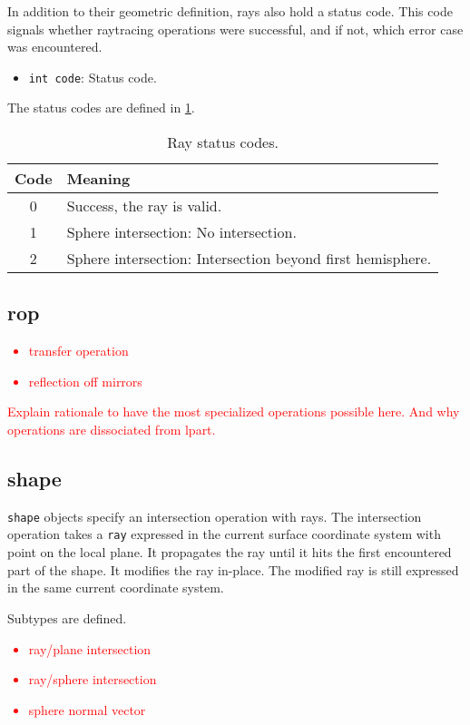 In addition to their geometric definition, rays also hold a status code.
This code signals whether raytracing operations were successful, and if
not, which error case was encountered.

\begin{itemize}
\item \lstinline{int code}: Status code.
\end{itemize}

The status codes are defined in \cref{tab:ray-status-codes}.

\begin{table} \caption{\label{tab:ray-status-codes} Ray status codes.}
\begin{tabular}{| c | l |} \hline
\textbf{Code} & \textbf{Meaning} \\ \hline
0 & Success, the ray is valid.\\ \hline
1 & Sphere intersection: No intersection. \\ \hline
2 & Sphere intersection: Intersection beyond first hemisphere. \\
\hline \end{tabular}
\end{table}

\subsection{rop}

\textcolor{red}{
\begin{itemize}
\item transfer operation
\item reflection off mirrors
\end{itemize}
Explain rationale to have the most specialized operations possible here.
And why operations are dissociated from lpart.}

\subsection{shape}
\lstinline{shape} objects specify an intersection operation with rays.
The intersection operation takes a \lstinline{ray} expressed in the current
surface coordinate system with point on the local plane. It propagates
the ray until it hits the first encountered part of the shape. It modifies
the ray in-place. The modified ray is still expressed in the same current
coordinate system.

Subtypes are defined.

\textcolor{red}{\begin{itemize}
\item ray/plane intersection
\item ray/sphere intersection
\item sphere normal vector
\end{itemize}}

